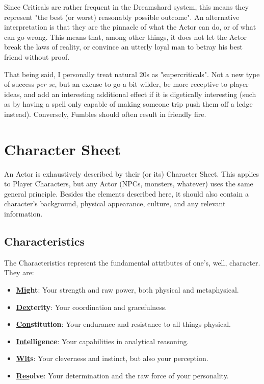 Since Criticals are rather frequent in the Dreamshard system, this means they represent "the best (or worst) reasonably possible outcome". An alternative interpretation is that they are the pinnacle of what the Actor can do, or of what can go wrong. This means that, among other things, it does not let the Actor break the laws of reality, or convince an utterly loyal man to betray his best friend without proof.

That being said, I personally treat natural 20s as "supercriticals". Not a new type of success \textit{per se}, but an excuse to go a bit wilder, be more receptive to player ideas, and add an interesting additional effect if it is digetically interesting (such as by having a spell only capable of making someone trip push them off a ledge instead). Conversely, Fumbles should often result in friendly fire.

\section{Character Sheet}

An Actor is exhaustively described by their (or its) Character Sheet. This applies to Player Characters, but any Actor (NPCs, monsters, whatever) uses the same general principle. Besides the elements described here, it should also contain a character's background, physical appearance, culture, and any relevant information.

\subsection{Characteristics}
\label{characteristics}



The Characteristics represent the fundamental attributes of one's, well, character. They are:

\begin{itemize}
	\item \textbf{\underline{Mig}ht}: Your strength and raw power, both physical and metaphysical.
	\item \textbf{\underline{Dex}terity}: Your coordination and gracefulness.
	\item \textbf{\underline{Con}stitution}: Your endurance and resistance to all things physical.
	\item \textbf{\underline{Int}elligence}: Your capabilities in analytical reasoning.
	\item \textbf{\underline{Wit}s}: Your cleverness and instinct, but also your perception.
	\item \textbf{\underline{Res}olve}: Your determination and the raw force of your personality.
\end{itemize}

